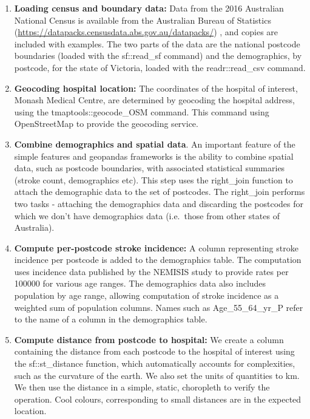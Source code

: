 \documentclass[utf8]{frontiersHLTH}
\begin{document}
\begin{enumerate}
\def\labelenumi{\arabic{enumi}.}
\item
  {\bf Loading census and boundary data:} Data from the 2016 Australian
  National Census is available from the Australian Bureau of Statistics
  (\url{https://datapacks.censusdata.abs.gov.au/datapacks/}) , and
  copies are included with examples. The two parts of the data are the
  national postcode boundaries (loaded with the sf::read\_sf command)
  and the demographics, by postcode, for the state of Victoria, loaded
  with the readr::read\_csv command.
\item
  {\bf Geocoding hospital location:} The coordinates of the hospital of
  interest, Monash Medical Centre, are determined by geocoding the
  hospital address, using the tmaptools::geocode\_OSM command. This
  command using OpenStreetMap to provide the geocoding service.
\item
  {\bf Combine demographics and spatial data}. An important feature of the
  simple features and geopandas frameworks is the ability to combine
  spatial data, such as postcode boundaries, with associated statistical
  summaries (stroke count, demographics etc). This step uses the
  right\_join function to attach the demographic data to the set of
  postcodes. The right\_join performs two tasks - attaching the
  demographics data and discarding the postcodes for which we don't have
  demographics data (i.e.~those from other states of Australia).
\item
  {\bf Compute per-postcode stroke incidence:} A column representing stroke
  incidence per postcode is added to the demographics table. The
  computation uses incidence data published by the NEMISIS\cite{thrift_stroke_2000}
  study to provide rates per 100000 for various age ranges. The
  demographics data also includes population by age range, allowing
  computation of stroke incidence as a weighted sum of population
  columns. Names such as Age\_55\_64\_yr\_P refer to the name of a
  column in the demographics table.
\item
  {\bf Compute distance from postcode to hospital:} We create a column
  containing the distance from each postcode to the hospital of interest
  using the sf::st\_distance function, which automatically accounts for
  complexities, such as the curvature of the earth. We also set the
  units of quantities to km. We then use the distance in a simple,
  static, choropleth to verify the operation. Cool colours,
  corresponding to small distances are in the expected location.

\end{enumerate}
\end{document}
